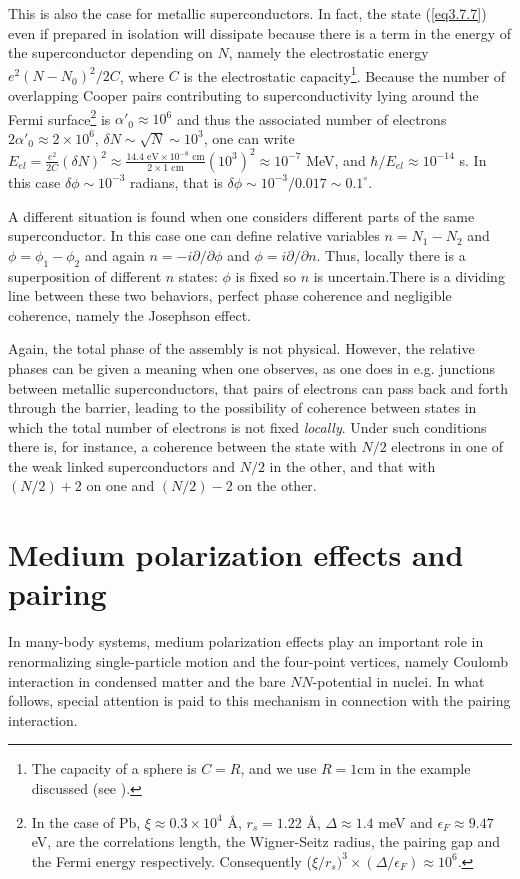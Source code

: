 This is also the case for metallic superconductors. In fact, the state (\ref{eq3.7.7}) even if prepared in isolation will dissipate because there is a term in the energy of the superconductor depending on $N$, namely the electrostatic energy $e^2(N-N_0)^2/2C$, where $C$ is the electrostatic capacity\footnote{The capacity of a sphere is $C=R$, and we use $R=1$cm in the example discussed (see \cite{Anderson:64b}).}. Because the number of overlapping Cooper pairs contributing to superconductivity lying around the Fermi surface\footnote{In the case of Pb, $\xi\approx0.3\times10^4$ \AA, $r_s=1.22$ \AA, $\Delta\approx1.4$ meV and $\epsilon_F\approx9.47$ eV, are the correlations length, the Wigner-Seitz radius, the pairing gap and the Fermi energy respectively. Consequently ($\xi/r_s)^3\times(\Delta/\epsilon_F)\approx10^6$.} is $\alpha'_0\approx10^6$ and thus the associated number of electrons $2\alpha'_0\approx2\times10^6$, $\delta N\sim\sqrt{N}\sim10^3$, one can write $E_{el}=\frac{e^2}{2C}(\delta N)^2\approx\frac{14.4\text{ eV}\times10^{-8}\text{ cm}}{2\times1\text{ cm}}(10^3)^2\approx10^{-7}$ MeV, and $\hbar/E_{el}\approx 10^{-14}$ s.  In this case $\delta\phi\sim10^{-3}$ radians, that is $\delta\phi\sim10^{-3}/0.017\sim0.1^{\circ}$.   


A different situation is found when one considers different parts of the same superconductor. In this case one can define relative variables $n=N_1-N_2$ and $\phi=\phi_1-\phi_2$ and again $n=-i\partial/\partial \phi$ and $\phi=i\partial/\partial n$. Thus, locally there is a superposition of different $n$ states: $\phi$ is fixed so $n$ is uncertain.There is  a dividing line between these two behaviors, perfect phase coherence and negligible coherence, namely the Josephson effect.


Again, the total phase of the assembly is not physical. However, the relative phases can be given a meaning when one observes, as one does in e.g. junctions between metallic superconductors, that pairs of electrons can pass back and forth through the barrier, leading to the possibility of coherence between states in which the total number of electrons is not fixed \emph{locally}. Under such conditions there is, for instance, a coherence between the state with $N/2$ electrons in one of the weak linked superconductors  and $N/2$ in the other, and that with $(N/2)+2$ on one   and $(N/2)-2$ on the other.
\section{Medium polarization effects and pairing}\label{C3AppEx}
In many-body systems, medium polarization effects play an important role in renormalizing single-particle motion and the four-point vertices, namely Coulomb interaction in condensed matter and the bare $NN$-potential in nuclei. In what follows, special attention is paid to this mechanism in connection with the pairing interaction.
